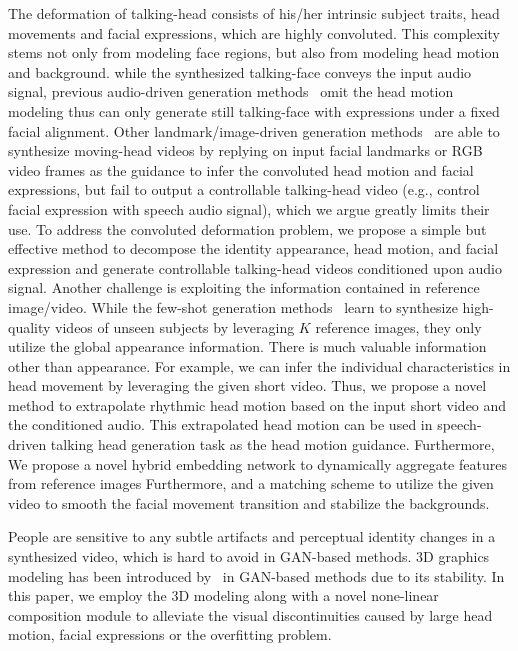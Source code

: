 \documentclass[runningheads]{llncs}
\begin{document}
The deformation of talking-head consists of his/her intrinsic subject traits, head movements and facial expressions, which are highly convoluted. This complexity stems not only from modeling face regions, but also from modeling head motion and background. while the synthesized talking-face conveys the input audio signal, previous audio-driven generation methods~\cite{Chung18b,wiles2018x2face,zhou2019talking,chen2018lip,ijcai2019-129,chen2019hierarchical} omit the head motion modeling thus can only generate still talking-face with expressions under a fixed facial alignment. Other landmark/image-driven generation methods~\cite{zakharov2019few,wang2018fewshotvid2vid,wang2018vid2vid,wang2018high,wiles2018x2face} are able to synthesize moving-head videos by replying on input facial landmarks or RGB video frames as the guidance to infer the convoluted head motion and facial expressions, but fail to output a controllable talking-head video (e.g., control facial expression with speech audio signal), which we argue greatly limits their use. To address the convoluted deformation problem, we propose a simple but effective method to decompose the identity appearance, head motion, and facial expression and generate controllable talking-head videos conditioned upon audio signal.     
Another challenge is exploiting the information contained in reference image/video. While the few-shot generation methods~\cite{zakharov2019few,wang2018fewshotvid2vid,liu2019few,yoo2019coloring} learn to synthesize high-quality videos of unseen subjects by leveraging $K$ reference images, they only utilize the global appearance information. There is much valuable information other than appearance. For example, we can infer the individual characteristics in head movement by leveraging the given short video. Thus, we propose a novel method to extrapolate rhythmic head motion based on the input short video and the conditioned audio. This extrapolated head motion can be used in speech-driven talking head generation task as the head motion guidance. Furthermore, We propose a novel hybrid embedding network to dynamically aggregate features from reference images Furthermore, and a matching scheme to utilize the given video to smooth the facial movement transition and stabilize the backgrounds.

People are sensitive to any subtle artifacts and perceptual identity changes in a synthesized video, which is hard to avoid in GAN-based methods. 3D graphics modeling has been introduced by~\cite{fried2019text,kim2018deep} in GAN-based methods due to its stability. In this paper, we employ the 3D modeling along with a novel none-linear composition module to alleviate the visual discontinuities caused by large head motion, facial expressions or the overfitting problem. 
\end{document}
